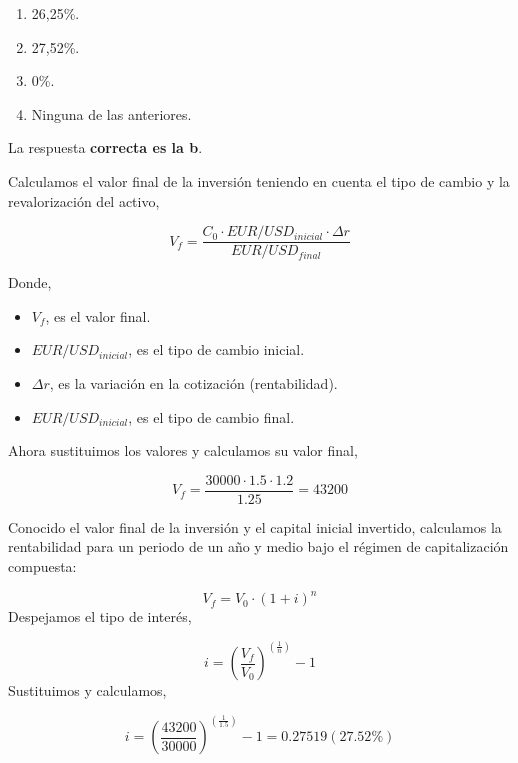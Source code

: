 \documentclass[
  letterpaper,
  DIV=11,
  numbers=noendperiod]{scrreprt}
\begin{document}
\begin{enumerate}
\def\labelenumi{\alph{enumi})}
\item
  26,25\%.
\item
  27,52\%.
\item
  0\%.
\item
  Ninguna de las anteriores.
\end{enumerate}

\begin{tcolorbox}[enhanced jigsaw, left=2mm, opacityback=0, colback=white, breakable, arc=.35mm, bottomrule=.15mm, rightrule=.15mm, toprule=.15mm, leftrule=.75mm, colframe=quarto-callout-tip-color-frame]
\begin{minipage}[t]{5.5mm}
\textcolor{quarto-callout-tip-color}{\faLightbulb}
\end{minipage}%
\begin{minipage}[t]{\textwidth - 5.5mm}

La respuesta \textbf{correcta es la b}.

Calculamos el valor final de la inversión teniendo en cuenta el tipo de
cambio y la revalorización del activo,

\[V_f=\frac{C_0\cdot{EUR}/{USD}_{inicial}\cdot\Delta r}{{EUR}/{USD}_{final}}\]

Donde,

\begin{itemize}
\item
  \(V_f\), es el valor final.
\item
  \({EUR}/{USD}_{inicial}\), es el tipo de cambio inicial.
\item
  \(\Delta r\), es la variación en la cotización (rentabilidad).
\item
  \({EUR}/{USD}_{inicial}\), es el tipo de cambio final.
\end{itemize}

Ahora sustituimos los valores y calculamos su valor final,

\[V_f=\frac{30000\cdot1.5\cdot1.2}{1.25}=43200\]

Conocido el valor final de la inversión y el capital inicial invertido,
calculamos la rentabilidad para un periodo de un año y medio bajo el
régimen de capitalización compuesta:

\[V_f=V_0\cdot\left(1+i\right)^n\] Despejamos el tipo de interés,

\[i=\left(\frac{V_f}{V_0}\right)^{\left(\frac{1}{n}\right)}-1\]
Sustituimos y calculamos,

\[i=\left(\frac{43200}{30000}\right)^{\left(\frac{1}{1.5}\right)}-1=0.27519(27.52\%)\]

\end{minipage}%
\end{tcolorbox}
\end{document}
